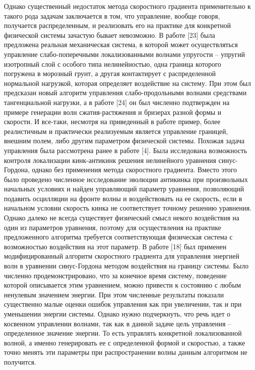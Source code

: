 Однако существенный недостаток метода скоростного градиента применительно к такого рода задачам заключается в том, что управление, вообще говоря, получается распределенным, и реализовать его на практике для конкретной физической системы зачастую бывает невозможно. В работе [23] была предложена реальная механическая система, в которой может осуществляться управление слабо-поперечными локализованными волнами упругости – упругий изотропный слой с особого типа нелинейностью, одна граница которого погружена в морозный грунт, а другая контактирует с распределенной нормальной нагрузкой, которая определяет воздействие на систему. При этом был предсказан новый алгоритм управления слабо-продольными волнами средствами тангенциальной нагрузки, а в работе [24] он был численно подтвержден на примере генерации волн сжатия-растяжения и бризерах разной формы и скорости. И все-таки, несмотря на приведенный в работе пример, более реалистичным и практически реализуемым является управление границей, внешним полем, либо другим параметром физической системы.
Похожая задача управления была рассмотрена ранее в работе [4]. Была исследована возможность контроля локализации кинк-антикинк решения нелинейного уравнения синус-Гордона, однако без применения метода скоростного градиента. Вместо этого было проведено численное исследование эволюции антикинка при произвольных начальных условиях и найден управляющий параметр уравнения, позволяющий подавить осцилляции на фронте волны и воздействовать на ее скорость, если в начальном условии скорость кинка не соответствует точному решению уравнения. Однако далеко не всегда существует физический смысл некого воздействия на один из параметров уравнения, поэтому для осуществления на практике предложенного алгоритма требуется соответствующая физическая система с возможностью воздействия на этот параметр.
В работе [18] был применен модифицированный алгоритм скоростного градиента для управления энергией волн в уравнении синус-Гордона методом воздействия на границу системы. Было численно продемонстрировано, что за конечное время систему, поведение которой описывается этим уравнением, можно привести к состоянию с любым ненулевым значением энергии. При этом численные результаты показали существенно малые оценки ошибок управления как при увеличении, так и при уменьшении энергии системы. Однако нужно подчеркнуть, что речь идет о косвенном управлении волнами, так как в данной задаче цель управления – определенное значение энергии. То есть управлять конкретной локализованной волной, а именно генерировать ее с определенной формой и скоростью, а также точно менять эти параметры при распространении волны данным алгоритмом не получится.

